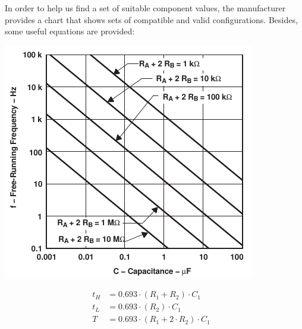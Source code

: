 \vspace{0.25cm}

In order to help us find a set of suitable component values, the manufacturer provides a chart that shows sets of compatible and valid configurations. Besides, some useful equations are provided:

\vspace{0.6cm}

\begin{minipage}{\textwidth}
    \begin{minipage}[c]{0.49\textwidth}
        \centering
        \includegraphics[scale=1]{Graphics/VHDL/Practice 2/GRAPHICS/555/GRAPHS/DATASHEETS/ASTABLE_FREQ.pdf}
        \label{fig:ASTABLE_FREQ}
    \end{minipage}
    \hfill
    \begin{minipage}[c]{0.49\textwidth}
        \centering
            \begin{align*}
                t_H &= 0.693 \cdot (R_1 + R_2) \cdot C_1& \\
                t_L &= 0.693 \cdot (R_2) \cdot C_1& \\
                T &= 0.693 \cdot (R_1 + 2\cdot R_2) \cdot C_1& \\
            \end{align*}
            
            \vspace{1.5cm}
    \end{minipage}
\end{minipage}

